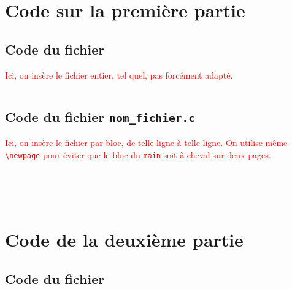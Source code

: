 \documentclass[12pt,a4paper,fleqn]{article}
\begin{document}
\pagestyle{fancy} %




\newpage
\section{Code sur la première partie}

\subsection{Code du fichier }
\textcolor{red}{Ici, on insère le fichier entier, tel quel, pas forcément adapté.}
\inputminted{c}{code/triangle.c}

\subsection{Code du fichier \texorpdfstring{\texttt{nom_fichier.c}}{nom\_fichier.c}}
\textcolor{red}{
Ici, on insère le fichier par bloc, de telle ligne à telle ligne. 
On utilise même \texttt{\textbackslash newpage} pour éviter que le bloc du \texttt{main} soit à cheval sur deux pages.}

\inputminted[firstline=1,lastline=20]{c}{code/triangle.c}
\inputminted[firstline=25,lastline=27]{c}{code/triangle.c}
\inputminted[firstline=35,lastline=37]{c}{code/triangle.c}
\inputminted[firstline=55,lastline=102]{c}{code/triangle.c}
\newpage
\inputminted[firstline=105,lastline=148]{c}{code/triangle.c}

\newpage
\section{Code de la deuxième partie}

\subsection{Code du fichier }
\end{document}
